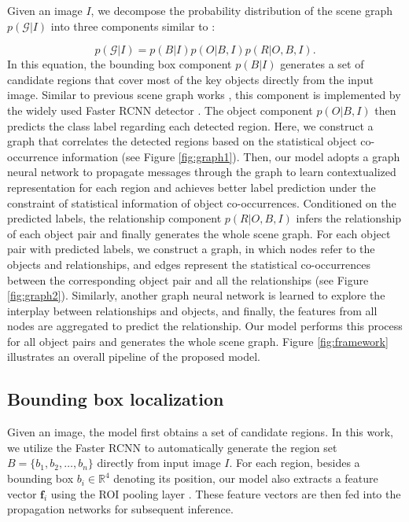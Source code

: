 \documentclass[10pt,twocolumn,letterpaper]{article}
\begin{document}
Given an image $I$, we decompose the probability distribution of the scene graph $p(\mathcal{G}|I)$ into three components similar to \cite{zellers2017neural}:

\begin{equation}
  p(\mathcal{G}|I)=p(B|I)p(O|B,I)p(R|O,B,I).
\end{equation}
In this equation, the bounding box component $p(B|I)$ generates a set of candidate regions that cover most of the key objects directly from the input image. Similar to previous scene graph works \cite{dai2017detecting,zellers2017neural}, this component is implemented by the widely used Faster RCNN detector \cite{ren2015faster}. The object component $p(O|B,I)$ then predicts the class label regarding each detected region. Here, we construct a graph that correlates the detected regions based on the statistical object co-occurrence information (see Figure \ref{fig:graph1}). Then, our model adopts a graph neural network \cite{scarselli2009graph,li2016gated} to propagate messages through the graph to learn contextualized representation for each region and achieves better label prediction under the constraint of statistical information of object co-occurrences. Conditioned on the predicted labels, the relationship component $p(R|O,B,I)$ infers the relationship of each object pair and finally generates the whole scene graph. For each object pair with predicted labels, we construct a graph, in which nodes refer to the objects and relationships, and edges represent the statistical co-occurrences between the corresponding object pair and all the relationships (see Figure \ref{fig:graph2}). Similarly, another graph neural network is learned to explore the interplay between relationships and objects, and finally, the features from all nodes are aggregated to predict the relationship. Our model performs this process for all object pairs and generates the whole scene graph. Figure \ref{fig:framework} illustrates an overall pipeline of the proposed model.

\subsection{Bounding box localization}
\label{sec:bbl}
Given an image, the model first obtains a set of candidate regions. In this work, we utilize the Faster RCNN \cite{ren2015faster} to automatically generate the region set $B=\{b_1, b_2, \dots, b_n\}$ directly from input image $I$. For each region, besides a bounding box $b_i \in \mathbb{R}^4$ denoting its position, our model also extracts a feature vector $\mathbf{f}_i$ using the ROI pooling layer \cite{girshick2015fast}. These feature vectors are then fed into the propagation networks for subsequent inference.
\end{document}
